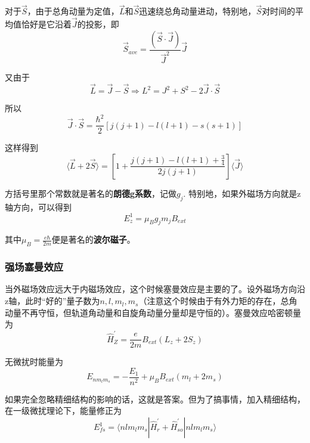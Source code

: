 \documentclass[UTF8]{ctexart}
\begin{document}
    对于$\vec{S}$，由于总角动量为定值，$\vec{L}$和$\vec{S}$迅速绕总角动量进动，特别地，$\vec{S}$对时间的平均值恰好是它沿着$\vec{J}$的投影，即
    \begin{equation}
        \vec{S}_{ave} = \frac{(\vec{S}\cdot \vec{J})}{\vec{J}^2}\vec{J}
    \end{equation}

\noindent 又由于
\begin{equation}
    \vec{L} = \vec{J} - \vec{S}  \Rightarrow L^2 = J^2 +S^2 - 2 \vec{J}\cdot \vec{S}
\end{equation}

所以 
\begin{equation}
    \vec{J}\cdot \vec{S} = \frac{\hbar^2}{2} \left[j(j+1) - l(l+1) - s(s+1)\right]
\end{equation}

\noindent 这样得到 
\begin{equation}
    \langle \vec{L} + 2 \vec{S} \rangle = \left[1 + \frac{j(j+1)-l(l+1) + \frac{3}{4}}{2j(j+1)}\right] \langle \vec{J} \rangle 
\end{equation}

\noindent 方括号里那个常数就是著名的\textbf{朗德g系数}，记做$g_j$. 特别地，如果外磁场方向就是z轴方向，可以得到
\begin{equation}
    E_z^1 = \mu_B g_j m_j B_{ext}
\end{equation}

\noindent 其中$\mu_B=\frac{e \hbar}{2m}$便是著名的\textbf{波尔磁子}。

    \subsubsection{强场塞曼效应}
    当外磁场效应远大于内磁场效应，这个时候塞曼效应是主要的了。设外磁场方向沿z轴，此时“好的”量子数为$n,l,m_l,m_s$（注意这个时候由于有外力矩的存在，总角动量不再守恒，但轨道角动量和自旋角动量分量却是守恒的）。塞曼效应哈密顿量为
    \begin{equation}
        \hat{H}_Z^{\prime} = \frac{e}{2m} B_{ext} (L_z + 2 S_z)
    \end{equation}

\noindent 无微扰时能量为
\begin{equation}
    E_{nm_lm_s} = -\frac{E_1}{n^2} + \mu_B B_{ext} (m_l + 2 m_s)
\end{equation}

\noindent 如果完全忽略精细结构的影响的话，这就是答案。但为了搞事情，加入精细结构，在一级微扰理论下，能量修正为
\begin{equation}
    E_{fs}^1 = \langle n l m_l m_s | \hat{H}_r^{\prime} + \hat{H}_{so}^{\prime} | nlm_l m_s \rangle
\end{equation}
\end{document}
